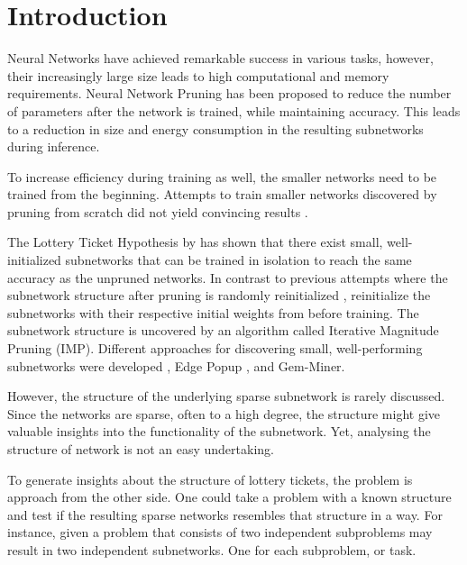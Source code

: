 \chapter{Introduction}
Neural Networks have achieved remarkable success in various tasks, however, their increasingly large size leads to high computational and memory requirements.
Neural Network Pruning \autocite{LeCun, OptimalBrainSurgeon, HanEtAl15, PruningFiltersForEfficientConvets} has been proposed to reduce the number of parameters after the network is trained, while maintaining accuracy.
This leads to a reduction in size \autocite{HanEtAl15} and energy consumption \autocite{YangCS17} in the resulting subnetworks during inference.

To increase efficiency during training as well, the smaller networks need to be trained from the beginning. Attempts to train smaller networks discovered by pruning from scratch did not yield convincing results \autocite{HanEtAl15, PruningFiltersForEfficientConvets}.

The Lottery Ticket Hypothesis by \textcite{DBLP:conf/iclr/FrankleC19} has shown that there exist small, well-initialized subnetworks that can be trained in isolation to reach the same accuracy as the unpruned networks. 
In contrast to previous attempts where the subnetwork structure after pruning is randomly reinitialized \autocite{HanEtAl15, PruningFiltersForEfficientConvets}, \textcite{DBLP:conf/iclr/FrankleC19} reinitialize the subnetworks with their respective initial weights from before training.
The subnetwork structure is uncovered by an algorithm called Iterative Magnitude Pruning (IMP).
Different approaches for discovering small, well-performing subnetworks were developed \autocite{DBLP:conf/nips/ZhouLLY19}, Edge Popup \autocite{DBLP:conf/cvpr/RamanujanWKFR20}, and Gem-Miner\autocite{RareGems}.

However, the structure of the underlying sparse subnetwork is rarely discussed.
Since the networks are sparse, often to a high degree, the structure might give valuable insights into the functionality of the subnetwork.
Yet, analysing the structure of network is not an easy undertaking.

To generate insights about the structure of lottery tickets, the problem is approach from the other side.
One could take a problem with a known structure and test if the resulting sparse networks resembles that structure in a way.
For instance, given a problem that consists of two independent subproblems may result in two independent subnetworks. 
One for each subproblem, or task.


